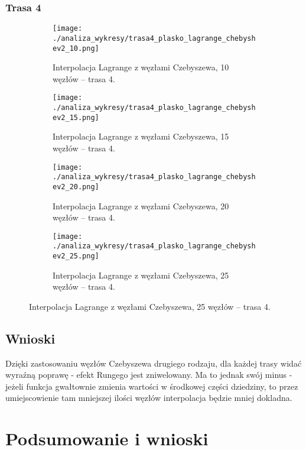 \documentclass[a4paper,12pt]{article}
\begin{document}
\subsubsection{Trasa 4}
\begin{figure}[H]
    \centering
    \begin{subfigure}{0.45\textwidth}
        \centering
        \texttt{[image: ./analiza\_wykresy/trasa4\_plasko\_lagrange\_chebyshev2\_10.png]}
        \caption{Interpolacja Lagrange z węzłami Czebyszewa, 10 węzłów – trasa 4.}
    \end{subfigure}\hfill
    \begin{subfigure}{0.45\textwidth}
        \centering
        \texttt{[image: ./analiza\_wykresy/trasa4\_plasko\_lagrange\_chebyshev2\_15.png]}
        \caption{Interpolacja Lagrange z węzłami Czebyszewa, 15 węzłów – trasa 4.}
    \end{subfigure}
    
    \vspace{0.5cm}
    
    \begin{subfigure}{0.45\textwidth}
        \centering
        \texttt{[image: ./analiza\_wykresy/trasa4\_plasko\_lagrange\_chebyshev2\_20.png]}
        \caption{Interpolacja Lagrange z węzłami Czebyszewa, 20 węzłów – trasa 4.}
    \end{subfigure}\hfill
    \begin{subfigure}{0.45\textwidth}
        \centering
        \texttt{[image: ./analiza\_wykresy/trasa4\_plasko\_lagrange\_chebyshev2\_25.png]}
        \caption{Interpolacja Lagrange z węzłami Czebyszewa, 25 węzłów – trasa 4.}
    \end{subfigure}
\end{figure}
\subsection{Wnioski}
Dzięki zastosowaniu węzłów Czebyszewa drugiego rodzaju, dla każdej trasy widać wyraźną poprawę - efekt Rungego jest zniwelowany. Ma to jednak swój minus - jeżeli funkcja gwałtownie zmienia wartości w środkowej części dziedziny, to przez umiejscowienie tam mniejszej ilości węzłów interpolacja będzie mniej dokladna.

\section{Podsumowanie i wnioski}
\end{document}
